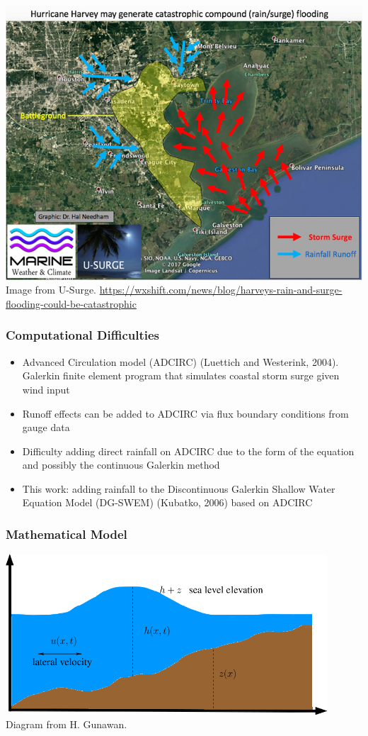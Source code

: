 \documentclass[10pt]{oden_beamer}
\begin{document}
\begin{frame}
  \frametitle{}
  \includegraphics[width=0.9\linewidth]{houston.jpg} \\
  \footnotesize
  Image from U-Surge. \url{https://wxshift.com/news/blog/harveys-rain-and-surge-flooding-could-be-catastrophic}
\end{frame}

\begin{frame}
  \frametitle{Computational Difficulties}
  \begin{itemize}
  \item Advanced Circulation model (ADCIRC) (Luettich and Westerink, 2004). Galerkin finite element program that simulates coastal storm surge given wind input
  \item Runoff effects can be added to ADCIRC via flux boundary conditions from gauge data
  \item Difficulty adding direct rainfall on ADCIRC due to the form of the equation and possibly the continuous Galerkin method
  \item This work: adding rainfall to the Discontinuous Galerkin Shallow Water Equation Model (DG-SWEM) (Kubatko, 2006) based on ADCIRC
  \end{itemize}
\end{frame}

\begin{frame}
  \frametitle{Mathematical Model}
  \centering
  \includegraphics[width=0.9\textwidth]{shallow.png} \\
  \footnotesize Diagram from H. Gunawan.
\end{frame}
\end{document}
